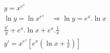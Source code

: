 \begin{ex}
\begin{align}
&y=x^{e^{x}}\nonumber\\
&\ln{y}=\ln{x^{e^{x}}}\quad \Rightarrow \ln{y}=e^{x}.\ln{x}\nonumber\\
&\frac{y'}{y}+e^{x}.\ln{x}+e^{x}.\frac{1}{x}\nonumber\\
&y'=x^{e^{x}}\left[e^{x}\left(\ln{x}+\frac{1}{x}\right)\right]\nonumber
\end{align}
\end{ex}